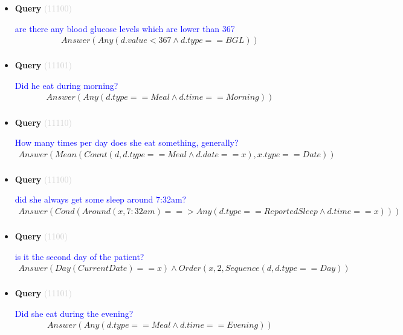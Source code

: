 \documentclass[11pt]{article}
\newcommand{\key}[1]{\textcolor{lightgray}{#1}}
\newcounter{CQuery}
\begin{document}
\begin{itemize}
\item
\textbf{Query\theCQuery} \key{(11100)} \addtocounter{CQuery}{1}
\textcolor{blue}{ are there any blood glucose levels which are lower than 367 }
\begin{multline*}
Answer(Any(d.value<367 \wedge d.type==BGL)) \\ 
\end{multline*}


\item
\textbf{Query\theCQuery} \key{(11101)} \addtocounter{CQuery}{1}
\textcolor{blue}{ Did he eat during morning? }
\begin{multline*}
Answer(Any(d.type==Meal \wedge d.time==Morning)) \\ 
\end{multline*}


\item
\textbf{Query\theCQuery} \key{(11110)} \addtocounter{CQuery}{1}
\textcolor{blue}{ How many times per day does she eat something, generally? }
\begin{multline*}
Answer(Mean(Count(d, d.type==Meal \wedge d.date==x), x.type==Date)) \\ 
\end{multline*}


\item
\textbf{Query\theCQuery} \key{(11100)} \addtocounter{CQuery}{1}
\textcolor{blue}{ did she always get some sleep around 7:32am? }
\begin{multline*}
Answer(Cond(Around(x, 7:32am) ==> Any(d.type==ReportedSleep \wedge d.time==x))) \\ 
\end{multline*}


\item
\textbf{Query\theCQuery} \key{(1100)} \addtocounter{CQuery}{1}
\textcolor{blue}{ is it the second day of the patient? }
\begin{multline*}
Answer(Day(CurrentDate)==x) \wedge Order(x, 2, Sequence(d, d.type==Day)) \\ 
\end{multline*}


\item
\textbf{Query\theCQuery} \key{(11101)} \addtocounter{CQuery}{1}
\textcolor{blue}{ Did she eat during the evening? }
\begin{multline*}
Answer(Any(d.type==Meal \wedge d.time==Evening)) \\ 
\end{multline*}



\end{itemize}
\end{document}
